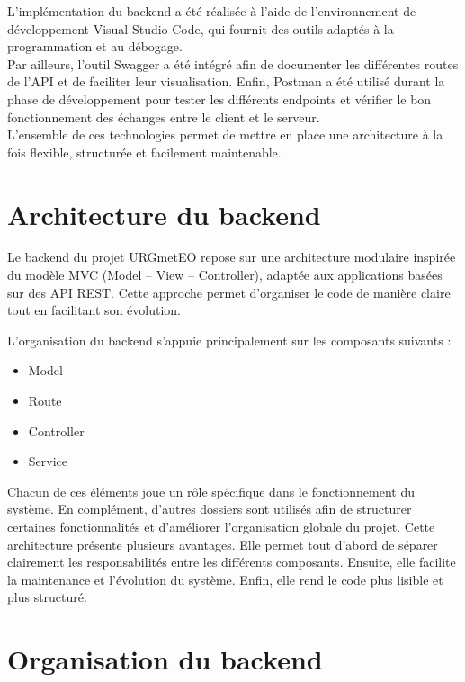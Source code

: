 \noindent L’implémentation du backend a été réalisée à l’aide de l’environnement de développement Visual Studio Code, qui fournit des outils adaptés à la programmation et au débogage.\\

\noindent Par ailleurs, l’outil Swagger a été intégré afin de documenter les différentes routes de l’API et de faciliter leur visualisation. Enfin, Postman a été utilisé durant la phase de développement pour tester les différents endpoints et vérifier le bon fonctionnement des échanges entre le client et le serveur.\\

\noindent L’ensemble de ces technologies permet de mettre en place une architecture à la fois flexible, structurée et facilement maintenable.

\section{Architecture du backend}

\noindent Le backend du projet URGmetEO repose sur une architecture modulaire inspirée du modèle MVC (Model -- View -- Controller), adaptée aux applications basées sur des API REST. Cette approche permet d’organiser le code de manière claire tout en facilitant son évolution.

\noindent L’organisation du backend s’appuie principalement sur les composants suivants :

\begin{itemize}
\item Model
\item Route
\item Controller
\item Service
\end{itemize}

\noindent Chacun de ces éléments joue un rôle spécifique dans le fonctionnement du système. En complément, d’autres dossiers sont utilisés afin de structurer certaines fonctionnalités et d’améliorer l’organisation globale du projet. Cette architecture présente plusieurs avantages. Elle permet tout d’abord de séparer clairement les responsabilités entre les différents composants. Ensuite, elle facilite la maintenance et l’évolution du système. Enfin, elle rend le code plus lisible et plus structuré.


\section{Organisation du backend}


